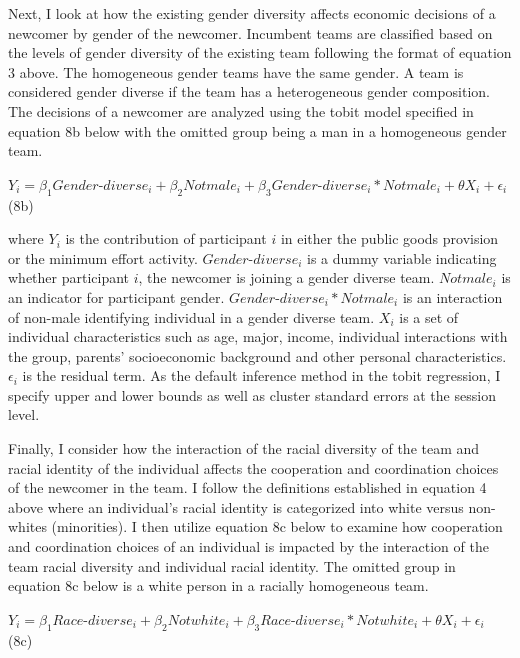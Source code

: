 Next, I look at how the existing gender diversity affects economic decisions of a newcomer by gender of the newcomer. Incumbent teams are classified based on the levels of gender diversity of the existing team following the format of equation 3 above. The homogeneous gender teams have the same gender. A team is considered gender diverse if the team has a heterogeneous gender composition. The decisions of a newcomer are analyzed using the tobit model specified in equation 8b below with the omitted group being a man in a homogeneous gender team.  


\begin{center}
$Y_{i}=\beta_1Gender$-$diverse_{i}+\beta_2Notmale_{i}+\beta_3Gender$-$diverse_{i}*Notmale_{i}+\theta X_{i} + \epsilon_{i} $ (8b)
\end{center}

\noindent where $Y_{i}$ is the contribution of participant $i$ in either the public goods provision or the minimum effort activity. $Gender$-$diverse_{i}$ is a dummy variable indicating whether participant $i$,  the newcomer is joining a gender diverse team. $Notmale_{i}$ is an indicator for participant gender. $Gender$-$diverse_{i}*Notmale_{i}$ is an interaction of non-male identifying individual in a gender diverse team. $X_{i}$ is a set of individual characteristics such as age, major, income, individual interactions with the group, parents' socioeconomic background and other personal characteristics. $\epsilon_{i}$ is the residual term. As the default inference method in the tobit regression, I specify upper and lower bounds as well as cluster standard errors at the session level.


\hspace  *{0mm} Finally, I consider how the interaction of the racial diversity of the team and racial identity of the individual affects the cooperation and coordination choices of the newcomer in the team. I follow the definitions established in equation 4 above where an individual's racial identity is categorized into white versus non-whites (minorities). I then utilize equation 8c below to examine how cooperation and coordination choices of an individual is impacted by the interaction of the team racial diversity and individual racial identity. The omitted group in equation 8c below is a white person in a racially homogeneous team. 

\begin{center}
 $ Y_{i} = \beta_1 Race$-$diverse_{i} + \beta_2 Notwhite_{i} + \beta_3 Race$-$diverse_{i}*Notwhite_{i} + \theta X_{i} + \epsilon_{i}  $  \space   (8c)
\end{center}

